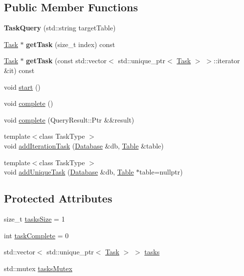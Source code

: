\subsection*{Public Member Functions}
\begin{DoxyCompactItemize}
\item 
\mbox{\label{class_task_query_a07799ce7089a4a84062b5e5813706425}} 
{\bfseries Task\+Query} (std\+::string target\+Table)
\item 
\mbox{\label{class_task_query_af216a94f17cb6b35a534947cb4ef9892}} 
\hyperlink{class_task}{Task} $\ast$ {\bfseries get\+Task} (size\+\_\+t index) const
\item 
\mbox{\label{class_task_query_ac5990fbd75ae30962dd7ef1369571889}} 
\hyperlink{class_task}{Task} $\ast$ {\bfseries get\+Task} (const std\+::vector$<$ std\+::unique\+\_\+ptr$<$ \hyperlink{class_task}{Task} $>$ $>$\+::iterator \&it) const
\item 
void \hyperlink{class_task_query_ad34220bba4a3fab50e5f59f63d7cf5e2}{start} ()
\item 
void \hyperlink{class_task_query_ab77bfd5f991d0cc596592966d3ed6193}{complete} ()
\item 
void \hyperlink{class_task_query_a91f0bc0a82e23db824e3ae6052026def}{complete} (Query\+Result\+::\+Ptr \&\&result)
\item 
{\footnotesize template$<$class Task\+Type $>$ }\\void \hyperlink{class_task_query_a9432212e101b6b393c13cf93e1211755}{add\+Iteration\+Task} (\hyperlink{class_database}{Database} \&db, \hyperlink{class_table}{Table} \&table)
\item 
{\footnotesize template$<$class Task\+Type $>$ }\\void \hyperlink{class_task_query_afb2a8505209d5f521570305f60203b2d}{add\+Unique\+Task} (\hyperlink{class_database}{Database} \&db, \hyperlink{class_table}{Table} $\ast$table=nullptr)
\end{DoxyCompactItemize}
\subsection*{Protected Attributes}
\begin{DoxyCompactItemize}
\item 
size\+\_\+t \hyperlink{class_task_query_a712ef51749dfd08ecdf6a33acaf6da4f}{tasks\+Size} = 1
\item 
int \hyperlink{class_task_query_a3dc3e4c56ddea8ff025239fd9da358d3}{task\+Complete} = 0
\item 
std\+::vector$<$ std\+::unique\+\_\+ptr$<$ \hyperlink{class_task}{Task} $>$ $>$ \hyperlink{class_task_query_a99c16ac776e6067ba79303396d398819}{tasks}
\item 
std\+::mutex \hyperlink{class_task_query_a147de82af025117cf5ae362dd4d75778}{tasks\+Mutex}
\end{DoxyCompactItemize}
